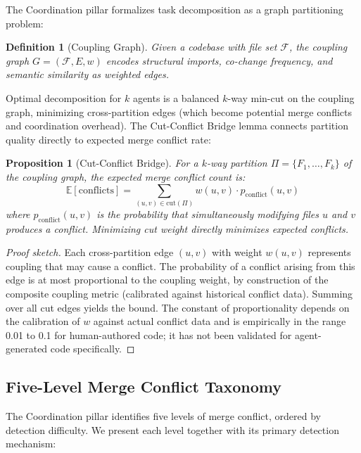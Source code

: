 \documentclass[11pt, a4paper]{googledeepmind}
\newtheorem{definition}{Definition}[section]
\newtheorem{proposition}{Proposition}[section]
\begin{document}
The Coordination pillar formalizes task decomposition as a graph partitioning problem:

\begin{definition}[Coupling Graph]
Given a codebase with file set $\mathcal{F}$, the coupling graph $G = (\mathcal{F}, E, w)$ encodes structural imports, co-change frequency, and semantic similarity as weighted edges.
\end{definition}

Optimal decomposition for $k$ agents is a balanced $k$-way min-cut on the coupling graph, minimizing cross-partition edges (which become potential merge conflicts and coordination overhead). The Cut-Conflict Bridge lemma connects partition quality directly to expected merge conflict rate:

\begin{proposition}[Cut-Conflict Bridge]
\label{prop:cut-conflict}
For a $k$-way partition $\Pi = \{F_1, \ldots, F_k\}$ of the coupling graph, the expected merge conflict count is:
\begin{equation}
    \mathbb{E}[\text{conflicts}] = \sum_{(u,v) \in \text{cut}(\Pi)} w(u,v) \cdot p_{\text{conflict}}(u,v)
\end{equation}
where $p_{\text{conflict}}(u,v)$ is the probability that simultaneously modifying files $u$ and $v$ produces a conflict. Minimizing cut weight directly minimizes expected conflicts.
\end{proposition}

\begin{proof}[Proof sketch]
Each cross-partition edge $(u,v)$ with weight $w(u,v)$ represents coupling that may cause a conflict. The probability of a conflict arising from this edge is at most proportional to the coupling weight, by construction of the composite coupling metric (calibrated against historical conflict data). Summing over all cut edges yields the bound. The constant of proportionality depends on the calibration of $w$ against actual conflict data and is empirically in the range 0.01 to 0.1 for human-authored code; it has not been validated for agent-generated code specifically.
\end{proof}

\subsection{Five-Level Merge Conflict Taxonomy}

The Coordination pillar identifies five levels of merge conflict, ordered by detection difficulty. We present each level together with its primary detection mechanism:
\end{document}
